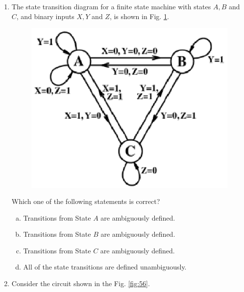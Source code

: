 \documentclass[journal,12pt,twocolumn]{IEEEtran}
\begin{document}
\begin{enumerate}
\item The state transition diagram for a finite state machine with states $A,B$ and $C$, and binary inputs $X,Y$ and $Z$, is shown in Fig. \ref{fig:55}.


\begin{figure}

\centering

\includegraphics[width=\columnwidth]{./figs/61.eps}

\caption{}

\label{fig:55}

\end{figure} 




Which one of the following statements is correct?

\begin{enumerate}[(a)]

\item Transitions from State $A$ are ambiguously defined.

\item Transitions from State $B$ are ambiguously defined.

\item Transitions from State $C$ are ambiguously defined.

\item All of the state transitions are defined unambiguously.

\end{enumerate}

\item Consider the circuit shown in the Fig. \ref{fig:56}.


\end{enumerate}
\end{document}
